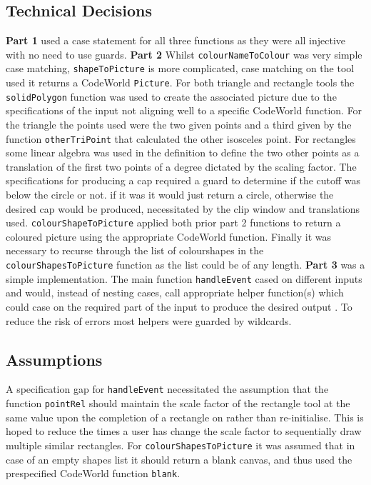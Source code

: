 \documentclass[11pt]{article}
\begin{document}
\subsection{Technical Decisions}
\textbf{Part 1} used a case statement for all three functions as they were all  injective with no need to use guards.
 \textbf{Part 2} Whilst \verb|colourNameToColour| was  very simple case matching, \verb|shapeToPicture| is more complicated, case matching on the tool used it returns a CodeWorld \verb|Picture|. For both triangle and rectangle tools the \verb|solidPolygon| function was used to create the associated picture due to the specifications of the input not aligning well to a specific CodeWorld function. For the triangle the points used were the two given points and a third given by the function \verb|otherTriPoint| that calculated the other isosceles point. For rectangles some linear algebra was used in the definition to define the two other points as a translation of the first two points of a degree dictated by the scaling factor. The specifications for producing a cap required a guard to determine if the cutoff was below the circle or not. if it was it would just return a circle, otherwise the desired cap would be produced, necessitated by the clip window and translations used. \verb|colourShapeToPicture| applied both prior part 2 functions to return a coloured picture using the appropriate CodeWorld function. Finally it was necessary to recurse through the list of colourshapes in the \verb|colourShapesToPicture| function as the list could be of any length.
 \textbf{Part 3} was a simple implementation. The main function \verb|handleEvent| cased on different inputs and would, instead of nesting cases, call appropriate helper function(s) which could case on the required part of the input to produce the desired output .  To reduce the risk of errors most helpers were guarded by wildcards.

 \subsection{Assumptions}%
A specification gap for \verb|handleEvent| necessitated the assumption that the function \verb|pointRel| should maintain the scale factor of the rectangle tool at the same value upon the completion of a rectangle on rather than re-initialise. This is hoped to reduce the times a user has change the scale factor to sequentially draw multiple similar rectangles. For \verb|colourShapesToPicture| it was assumed that in case of an empty shapes list it should return a blank canvas, and thus used the prespecified CodeWorld function \verb|blank|.
\end{document}
